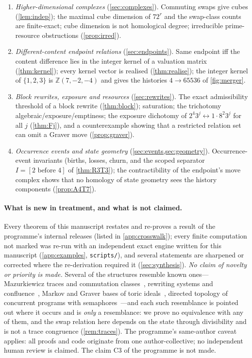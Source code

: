 \begin{enumerate}[leftmargin=2.2em,itemsep=2pt]
\item[\textbf{HII-6}] \emph{Higher-dimensional complexes} (\cref{sec:complexes}). Commuting swaps give cubes (\cref{lem:indep}); the maximal cube dimension of $72^r$ and the swap-class counts are finite-exact; cube dimension is not homological degree; irreducible prime-resource obstructions (\cref{prop:irred}).
\item[\textbf{HII-7}] \emph{Different-content endpoint relations} (\cref{sec:endpoints}). Same endpoint iff the content difference lies in the integer kernel of a valuation matrix (\cref{thm:kernel}); every kernel vector is realised (\cref{thm:realise}); the integer kernel of $\{1,2,3\}$ is $\mathbb Z(7,-2,-4)$ and gives the histories $4\to 65536$ of \cref{fig:merger}.
\item[\textbf{HII-8}] \emph{Block rewrites, exposure and resources} (\cref{sec:rewrites}). The exact admissibility threshold of a block rewrite (\cref{thm:block}); saturation; the trichotomy algebraic/exposure/emptiness; the exposure dichotomy of $2^4 3^j\leftrightarrow 1\cdot 8^2 3^j$ for all $j$ (\cref{thm:Fj}), and a counterexample showing that a restricted relation set can omit a Graver move (\cref{prop:graver}).
\item[\textbf{HII-9}] \emph{Occurrence events and state geometry} (\cref{sec:events,sec:geometry}). Occurrence-event invariants (births, losses, churn, and the scoped separator $I=[2\text{ before }4]$ of \cref{thm:R3T3}); the contractibility of the endpoint's move complex shows that no homology of state geometry sees the history components (\cref{prop:A4T7}).
\end{enumerate}

\paragraph{What is new in treatment, and what is not claimed.}
Every theorem of this manuscript restates and re-proves a result of the programme's internal releases (listed in \cref{app:crosswalk}); every finite computation not marked  was re-run with an independent exact engine written for this manuscript (\cref{app:examples}, \texttt{scripts/}), and several statements are sharpened or corrected where the re-derivation required it (\cref{sec:synthesis}). \emph{No claim of novelty or priority is made.} Several of the structures resemble known ones---Mazurkiewicz traces and commutation classes~\cite{Mazurkiewicz1987,CartierFoata1969,DiekertRozenberg1995}, rewriting systems and confluence~\cite{Newman1942,BaaderNipkow1998}, Markov and Graver bases of toric ideals~\cite{Graver1975,Sturmfels1996,DiaconisSturmfels1998}, directed topology of concurrent programs with semaphores~\cite{Pratt1991,FajstrupEtAl2016}---and each such resemblance is pointed out where it occurs and is \emph{only} a resemblance: we prove no equivalence with any of them, and the swap relation here depends on the state through divisibility and is not a trace congruence (\cref{rem:traces}). The programme's same-author caveat applies: all proofs and code originate from one author-collective; no independent human review is claimed. The claim C3 of the programme is not made.

